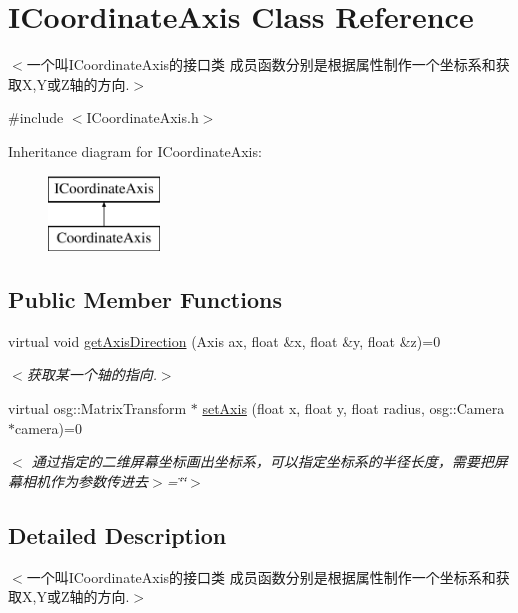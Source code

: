 \hypertarget{class_i_coordinate_axis}{}\section{I\+Coordinate\+Axis Class Reference}
\label{class_i_coordinate_axis}


$<$一个叫\+I\+Coordinate\+Axis的接口类 成员函数分别是根据属性制作一个坐标系和获取X,Y或\+Z轴的方向.$>$  




{\ttfamily \#include $<$I\+Coordinate\+Axis.\+h$>$}

Inheritance diagram for I\+Coordinate\+Axis\+:\begin{figure}[H]
\begin{center}
\leavevmode
\includegraphics[height=2.000000cm]{class_i_coordinate_axis}
\end{center}
\end{figure}
\subsection*{Public Member Functions}
\begin{DoxyCompactItemize}
\item 
virtual void \hyperlink{class_i_coordinate_axis_ad22ead68acd66ed2d191017fd12697b7}{get\+Axis\+Direction} (Axis ax, float \&x, float \&y, float \&z)=0
\begin{DoxyCompactList}\small\item\em $<$获取某一个轴的指向.$>$ \end{DoxyCompactList}\item 
virtual osg\+::\+Matrix\+Transform $\ast$ \hyperlink{class_i_coordinate_axis_a4e5694296507a4e86e0fdfbd4ba6a4b8}{set\+Axis} (float x, float y, float radius, osg\+::\+Camera $\ast$camera)=0
\begin{DoxyCompactList}\small\item\em $<$ 通过指定的二维屏幕坐标画出坐标系，可以指定坐标系的半径长度，需要把屏幕相机作为参数传进去$>$=\char`\"{}\char`\"{}$>$ \end{DoxyCompactList}\end{DoxyCompactItemize}


\subsection{Detailed Description}
$<$一个叫\+I\+Coordinate\+Axis的接口类 成员函数分别是根据属性制作一个坐标系和获取X,Y或\+Z轴的方向.$>$ 

